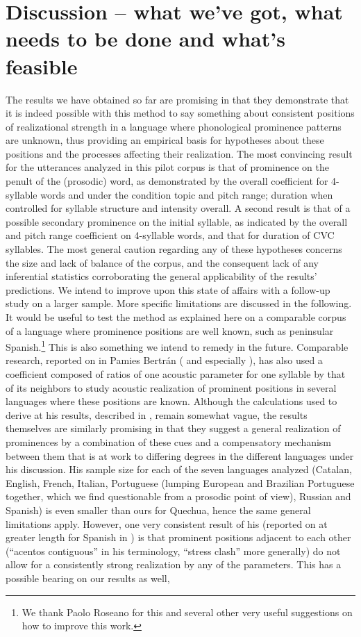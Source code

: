 \documentclass[output=paper]{LSP/langsci}
\begin{document}
\section{Discussion – what we’ve got, what needs to be done and what’s feasible}
The results we have obtained so far are promising in that they demonstrate that it is indeed possible with this method to say something about consistent positions of realizational strength in a language where phonological prominence patterns are unknown, thus providing an empirical basis for hypotheses about these positions and the processes affecting their realization. The most convincing result for the utterances analyzed in this pilot corpus is that of prominence on the penult of the (prosodic) word, as demonstrated by the overall coefficient for 4-syllable words and under the condition topic and pitch range; duration when controlled for syllable structure and intensity overall. A second result is that of a possible secondary prominence on the initial syllable, as indicated by the overall and pitch range coefficient on 4-syllable words, and that for duration of CVC syllables. The most general caution regarding any of these hypotheses concerns the size and lack of balance of the corpus, and the consequent lack of any inferential statistics corroborating the general applicability of the results’ predictions. We intend to improve upon this state of affairs with a follow-up study on a larger sample. More specific limitations are discussed in the following. It would be useful to test the method as explained here on a comparable corpus of a language where prominence positions are well known, such as peninsular Spanish.\footnote{We thank Paolo Roseano for this and several other very useful suggestions on how to improve this work.}  This is also something we intend to remedy in the future. Comparable research, reported on in Pamies Bertrán (\citeyear{PamiesBertran1994} and especially \citeyear{PamiesBertran1996}), has also used a coefficient composed of ratios of one acoustic parameter for one syllable by that of its neighbors to study acoustic realization of prominent positions in several languages where these positions are known. Although the calculations used to derive at his results, described in \citet[27--29]{PamiesBertran1996}, remain somewhat vague, the results themselves are similarly promising in that they suggest a general realization of prominences by a combination of these cues and a compensatory mechanism between them that is at work to differing degrees in the different languages under his discussion. His sample size for each of the seven languages analyzed (Catalan, English, French, Italian, Portuguese (lumping European and Brazilian Portuguese together, which we find questionable from a prosodic point of view), Russian and Spanish) is even smaller than ours for Quechua, hence the same general limitations apply. However, one very consistent result of his (reported on at greater length for Spanish in \citealt{PamiesBertran1994}) is that prominent positions adjacent to each other (“acentos contiguous” in his terminology, “stress clash” more generally) do not allow for a consistently strong realization by any of the parameters. This has a possible bearing on our results as well, 
\end{document}
